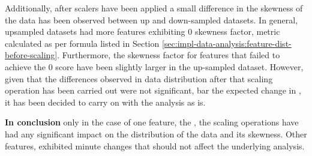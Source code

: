 Additionally, after scalers have been applied a small difference in the skewness of the data has been observed between up and down-sampled datasets. In general, upsampled datasets had more features exhibiting 0 skewness factor, metric calculated as per formula listed in Section \ref{sec:impl-data-analysis:feature-dist-before-scaling}. Furthermore, the skewness factor for features that failed to achieve the 0 score have been slightly larger in the up-sampled dataset. 
However, given that the differences observed in data distribution after that scaling operation has been carried out were not significant, bar the expected change in \fileAgeInSec{}, it has been decided to carry on with the analysis as is.

\textbf{In conclusion} only in the case of one feature, the \fileAgeInSec{}, the scaling operations have had any significant impact on the distribution of the data and its skewness. Other features, exhibited minute changes that should not affect the underlying analysis.
\FloatBarrier